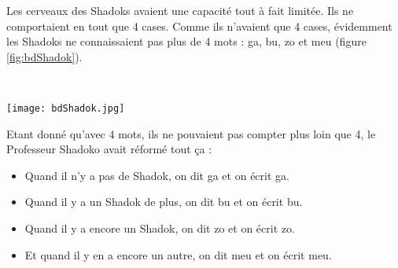 
\begin{td}\label{td:shadok}
Les cerveaux des Shadoks avaient une capacité tout à fait limitée.
Ils ne comportaient en tout que 4 cases.
Comme ils n'avaient que 4 cases, évidemment les Shadoks ne connaissaient 
pas plus de 4 mots :  {\sc ga, bu, zo et meu} (figure \ref{fig:bdShadok}).
\begin{fig}\label{fig:bdShadok}
\mbox{}\\
\centerline{\texttt{[image: bdShadok.jpg]}}
\end{fig}
Etant donné qu'avec 4 mots, ils ne pouvaient pas compter plus loin que 4,
le Professeur Shadoko avait réformé tout ça :
\begin{itemize}
\item Quand il n'y a pas de Shadok, on dit {\sc ga} et on écrit {\sc ga}.
\item Quand il y a un Shadok de plus, on dit {\sc bu} et on écrit {\sc bu}.
\item Quand il y a encore un Shadok, on dit {\sc zo} et on écrit {\sc zo}.
\item Et quand il y en a encore un autre, on dit {\sc meu} et on écrit {\sc meu}.
\end{itemize}


\end{td}

